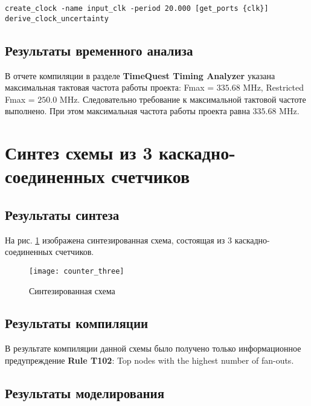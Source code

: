 \begin{lstlisting}[caption=Synopsys Design Constraints (SDC) файл, label=code:sdc]
create_clock -name input_clk -period 20.000 [get_ports {clk}]
derive_clock_uncertainty
\end{lstlisting}

\subsection{Результаты временного анализа}

В отчете компиляции в разделе \textbf{TimeQuest Timing Analyzer} указана максимальная тактовая частота работы проекта: Fmax = $335.68$ MHz, Restricted Fmax = $250.0$ MHz. Следовательно требование к максимальной тактовой частоте выполнено. При этом максимальная частота работы проекта равна $335.68$ MHz.

\newpage

\section{Синтез схемы из 3 каскадно-соединенных счетчиков}

\subsection{Результаты синтеза}

На рис. \ref{fig:counter_three} изображена синтезированная схема, состоящая из 3 каскадно-соединенных счетчиков.

\begin{figure}[H]
\begin{center}
	\texttt{[image: counter\_three]}
	\caption{Синтезированная схема}
	\label{fig:counter_three}
\end{center}
\end{figure}

\subsection{Результаты компиляции}

В результате компиляции данной схемы было получено только информационное предупреждение \textbf{Rule T102}: Top nodes with the highest number of fan-outs.

\subsection{Результаты моделирования}

